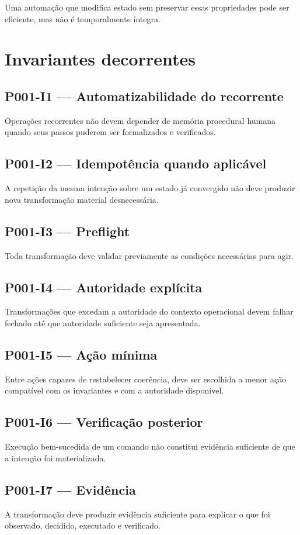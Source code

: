 Uma automação que modifica estado sem preservar essas propriedades pode ser
eficiente, mas não é temporalmente íntegra.

\section{Invariantes decorrentes}

\subsection*{P001-I1 --- Automatizabilidade do recorrente}
Operações recorrentes não devem depender de memória procedural humana quando
seus passos puderem ser formalizados e verificados.

\subsection*{P001-I2 --- Idempotência quando aplicável}
A repetição da mesma intenção sobre um estado já convergido não deve produzir
nova transformação material desnecessária.

\subsection*{P001-I3 --- Preflight}
Toda transformação deve validar previamente as condições necessárias para agir.

\subsection*{P001-I4 --- Autoridade explícita}
Transformações que excedam a autoridade do contexto operacional devem falhar
fechado até que autoridade suficiente seja apresentada.

\subsection*{P001-I5 --- Ação mínima}
Entre ações capazes de restabelecer coerência, deve ser escolhida a menor ação
compatível com os invariantes e com a autoridade disponível.

\subsection*{P001-I6 --- Verificação posterior}
Execução bem-sucedida de um comando não constitui evidência suficiente de que a
intenção foi materializada.

\subsection*{P001-I7 --- Evidência}
A transformação deve produzir evidência suficiente para explicar o que foi
observado, decidido, executado e verificado.

